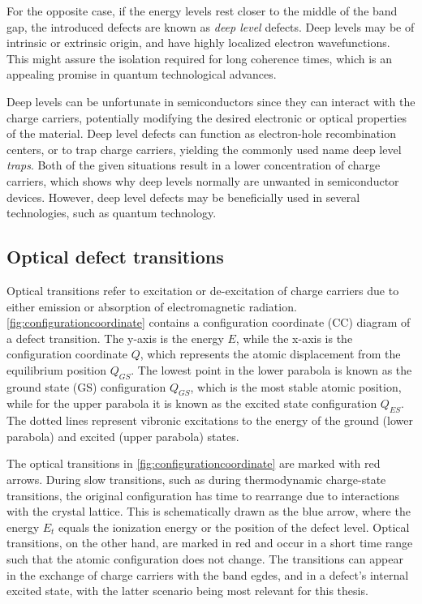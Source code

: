 For the opposite case, if the energy levels rest closer to the middle of the band gap, the introduced defects are known as \textit{deep level} defects. Deep levels may be of intrinsic or extrinsic origin, %
and have highly localized electron wavefunctions. This might assure the isolation required for long coherence times, which is an appealing promise in quantum technological advances.

Deep levels can be unfortunate in semiconductors since they can interact with the charge carriers, potentially modifying the desired electronic or optical properties of the material. Deep level defects can function as electron-hole recombination centers, or to trap charge carriers, yielding the commonly used name deep level \textit{traps}. Both of the given situations result in a lower concentration of charge carriers, which shows why deep levels normally are unwanted in semiconductor devices. %
However, deep level defects may be beneficially used in several technologies, such as quantum technology. %

\subsection{Optical defect transitions}

Optical transitions refer to excitation or de-excitation of charge carriers due to either emission or absorption of electromagnetic radiation. %
\autoref{fig:configurationcoordinate} contains a configuration coordinate (CC) diagram of a defect transition. The y-axis is the energy $E$, while the x-axis is the configuration coordinate $Q$, which represents the atomic displacement from the equilibrium position $Q_{GS}$. The lowest point in the lower parabola is known as the ground state (GS) configuration $Q_{GS}$, which is the most stable atomic position, while for the upper parabola it is known as the excited state configuration $Q_{ES}$. The dotted lines represent vibronic excitations to the energy of the ground (lower parabola) and excited (upper parabola) states.



\noindent The optical transitions in \autoref{fig:configurationcoordinate} are marked with red arrows. During slow transitions, such as during thermodynamic charge-state transitions, the original configuration has time to rearrange due to interactions with the crystal lattice. This is schematically drawn as the blue arrow, where the energy $E_t$ equals the ionization energy or the position of the defect level. Optical transitions, on the other hand, are marked in red and occur in a short time range such that the atomic configuration does not change. The transitions can appear in the exchange of charge carriers with the band egdes, and in a defect's internal excited state, with the latter scenario being most relevant for this thesis.

